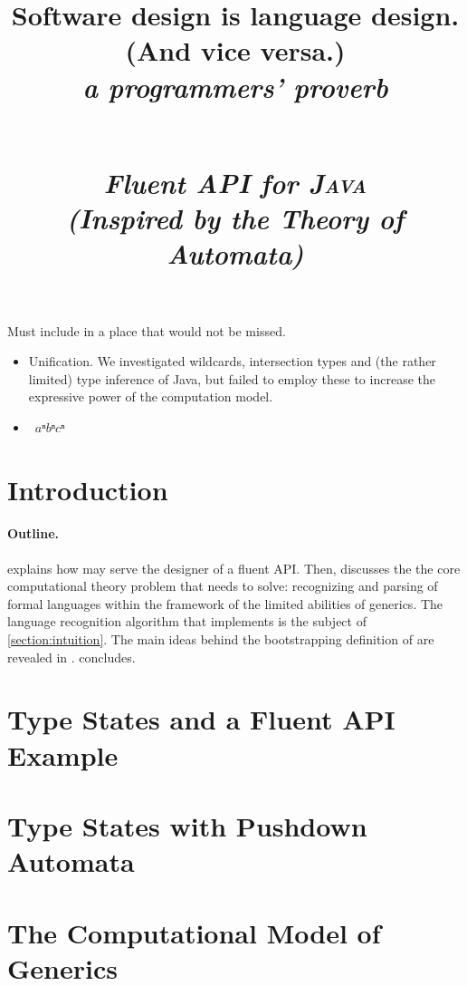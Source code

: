 \documentclass[nonatbib,preprint,numbers]{sigplanconf}
\title{%
\begin{flushright}
  \scriptsize\bfseries
  Software design is language design. \\
    (And vice versa.) \\
  \footnotesize\mdseries\itshape
   a programmers' proverb
\end{flushright}
  \Huge \Fajita \\ 
  \huge \itshape \textbf Fluent \textbf API for \textsc{\textbf Java} \\
  \LARGE (\textbf Inspired by the \textbf Theory of \textbf Automata)
}
\begin{document}
\maketitle

\begin{abstract}
  
\end{abstract}

Must include in a place that would not be missed.
\begin{itemize}
  \item \Prolog Unification.  We investigated wildcards, intersection types and
    (the rather limited) type inference of Java, but failed to employ these to
    increase the expressive power of the computation model.
        \item~$aⁿbⁿcⁿ$
\end{itemize}

\section{Introduction}


\paragraph{Outline.} 


  explains how \Fajita may serve the designer of a fluent API. 
Then,  discusses the 
  the core computational theory problem that \Fajita 
  needs to solve: recognizing and parsing of formal languages
  within the framework of the limited abilities of \Java
  generics.
The language recognition algorithm that \Fajita
  implements is the subject of \cref{section:intuition}.
The main ideas behind the bootstrapping definition of \Self 
  are revealed in . 
 concludes. 

\section{Type States and a Fluent API Example}
\label{section:example}


\section{Type States with Pushdown Automata}
\label{section:generalization}


\section{The Computational Model of \protect\Java Generics}
\label{section:background}

\end{document}
